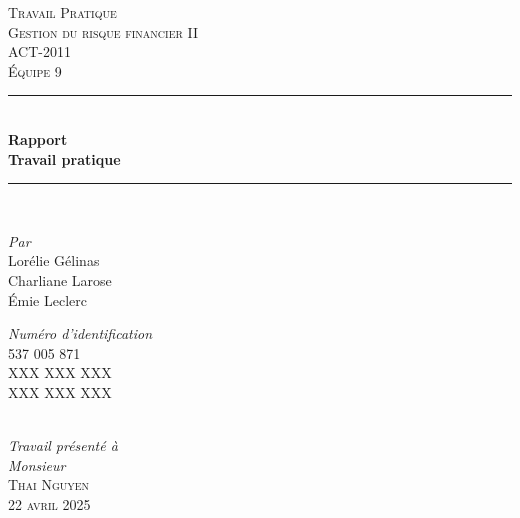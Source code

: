 \documentclass[
]{article}
\author{}
\date{\vspace{-2.5em}}
\begin{document}
\begin{titlepage}

\newcommand{\HRule}{\rule{\linewidth}{0.5mm}} %

\center %
\textsc{\LARGE Travail Pratique}\\[1.0cm]
\textsc{\Large Gestion du risque financier II}\\[0.2cm]
\textsc{\large ACT-2011}\\[0.7cm]
\textsc{\large Équipe 9}\\[0.7cm]

\HRule \\[0.4cm]
{ \Large \bfseries Rapport}\\[0.20cm] { \huge \bfseries Travail pratique}\\[0.20cm]

\HRule \\[2cm]

\begin{minipage}{0.4\textwidth}
    \begin{flushleft} \large
    \emph{Par}\\
        Lorélie Gélinas \textsc{}\\
        Charliane Larose \textsc{}\\
        Émie Leclerc \textsc{}
    \end{flushleft}
\end{minipage}%
\begin{minipage}{0.4\textwidth}
    \begin{flushright} \large
    \emph{Numéro d'identification}\\
        537 005 871\\
        XXX XXX XXX\\
        XXX XXX XXX\\
    \end{flushright}
\end{minipage} \\[1.0cm]

\emph{Travail présenté à} \\
\emph{Monsieur} \\[0.1cm]
\textsc{\Large Thai \textsc{Nguyen}}\\[1.0cm]

\textsc{\large 22 avril 2025}\\[1cm]
 
\vfill %

\end{titlepage}
\end{document}
